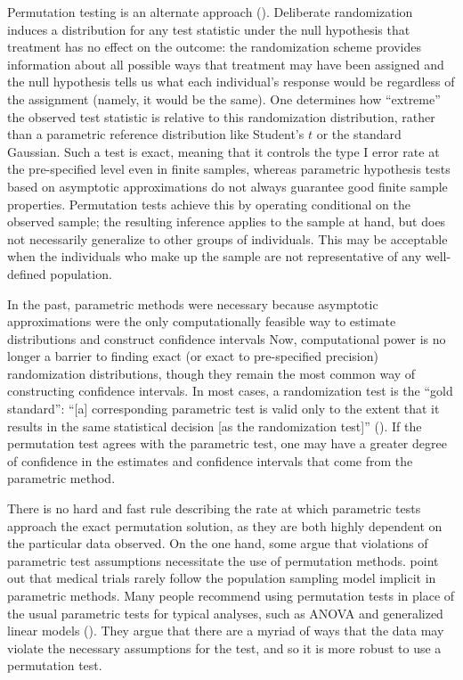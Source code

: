 \documentclass[12pt]{article}
\begin{document}
Permutation testing is an alternate approach (\cite{fisher_design_1935, pitman_significance_1937,pitman_significance_1938}).
Deliberate randomization induces a distribution for any test statistic under the null hypothesis that treatment has no effect on the outcome:
the randomization scheme provides information about all possible ways that treatment may have been assigned 
and the null hypothesis tells us what each individual's response would be regardless of the assignment (namely, it would be the same).
One determines how ``extreme'' the observed test statistic is relative to this randomization distribution, rather than a parametric reference distribution like Student's $t$ or the standard Gaussian.
Such a test is exact, meaning that it controls the type I error rate at the pre-specified level even in finite samples, whereas parametric hypothesis tests based on asymptotic approximations do not always guarantee good finite sample properties.
Permutation tests achieve this by operating conditional on the observed sample; the resulting inference applies to the sample at hand, but does not necessarily generalize to other groups of individuals.
This may be acceptable when the individuals who make up the sample are not representative of any well-defined population.

In the past, parametric methods were necessary because asymptotic approximations were the only computationally feasible way to estimate distributions and construct confidence intervals
Now, computational power is no longer a barrier to finding exact (or exact to pre-specified precision) randomization distributions, though they remain the most common way of constructing confidence intervals.
In most cases, a randomization test is the ``gold standard'':
``[a] corresponding parametric test is valid only to the extent that it results in the same statistical decision [as the randomization test]'' (\cite{bradley_distribution_1968}).
If the permutation test agrees with the parametric test, one may have a greater degree of confidence in the estimates and confidence intervals that come from the parametric method.

There is no hard and fast rule describing the rate at which parametric tests approach the exact permutation solution, as they are both highly dependent on the particular data observed.
On the one hand, some argue that violations of parametric test assumptions necessitate the use of permutation methods.
\cite{ludbrook_why_1998} point out that medical trials rarely follow the population sampling model implicit in parametric methods.
Many people recommend using permutation tests in place of the usual parametric tests for typical analyses, such as ANOVA and generalized linear models (\cite{still_approximate_1981, winkler_permutation_2014}).
They argue that there are a myriad of ways that the data may violate the necessary assumptions for the test, and so it is more robust to use a permutation test.
\end{document}
